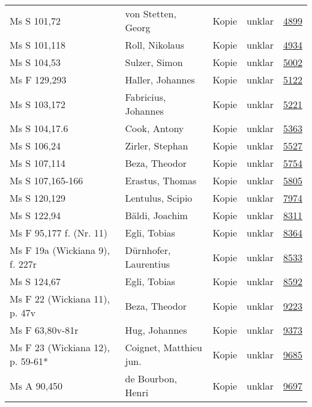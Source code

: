\documentclass[10pt,a4paper,landscape]{report}
\begin{document}
\begin{longtable}{p{16cm}p{4cm}llr}
Ms S 101,72	&	von Stetten, Georg	&	Kopie	&	unklar	&	\href{http://130.60.24.72/assignment/4899}{4899}\\
Ms S 101,118	&	Roll, Nikolaus	&	Kopie	&	unklar	&	\href{http://130.60.24.72/assignment/4934}{4934}\\
Ms S 104,53	&	Sulzer, Simon	&	Kopie	&	unklar	&	\href{http://130.60.24.72/assignment/5002}{5002}\\
Ms F 129,293	&	Haller, Johannes	&	Kopie	&	unklar	&	\href{http://130.60.24.72/assignment/5122}{5122}\\
Ms S 103,172	&	Fabricius, Johannes	&	Kopie	&	unklar	&	\href{http://130.60.24.72/assignment/5221}{5221}\\
Ms S 104,17.6	&	Cook, Antony	&	Kopie	&	unklar	&	\href{http://130.60.24.72/assignment/5363}{5363}\\
Ms S 106,24	&	Zirler, Stephan	&	Kopie	&	unklar	&	\href{http://130.60.24.72/assignment/5527}{5527}\\
Ms S 107,114	&	Beza, Theodor	&	Kopie	&	unklar	&	\href{http://130.60.24.72/assignment/5754}{5754}\\
Ms S 107,165-166	&	Erastus, Thomas	&	Kopie	&	unklar	&	\href{http://130.60.24.72/assignment/5805}{5805}\\
Ms S 120,129	&	Lentulus, Scipio	&	Kopie	&	unklar	&	\href{http://130.60.24.72/assignment/7974}{7974}\\
Ms S 122,94	&	Bäldi, Joachim	&	Kopie	&	unklar	&	\href{http://130.60.24.72/assignment/8311}{8311}\\
Ms F 95,177 f. (Nr. 11)	&	Egli, Tobias	&	Kopie	&	unklar	&	\href{http://130.60.24.72/assignment/8364}{8364}\\
Ms F 19a (Wickiana 9), f. 227r	&	Dürnhofer, Laurentius	&	Kopie	&	unklar	&	\href{http://130.60.24.72/assignment/8533}{8533}\\
Ms S 124,67	&	Egli, Tobias	&	Kopie	&	unklar	&	\href{http://130.60.24.72/assignment/8592}{8592}\\
Ms F 22 (Wickiana 11), p. 47v	&	Beza, Theodor	&	Kopie	&	unklar	&	\href{http://130.60.24.72/assignment/9223}{9223}\\
Ms F 63,80v-81r	&	Hug, Johannes	&	Kopie	&	unklar	&	\href{http://130.60.24.72/assignment/9373}{9373}\\
Ms F 23 (Wickiana 12), p. 59-61*	&	Coignet, Matthieu jun.	&	Kopie	&	unklar	&	\href{http://130.60.24.72/assignment/9685}{9685}\\
Ms A 90,450	&	de Bourbon, Henri	&	Kopie	&	unklar	&	\href{http://130.60.24.72/assignment/9697}{9697}\\

\end{longtable}
\end{document}
